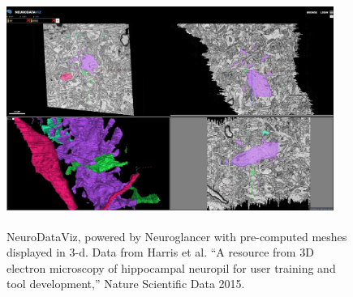 \documentclass[simplex.tex]{subfiles}
\begin{document}
\begin{figure}[!h]
\begin{cframed}
\centering
\includegraphics[width=0.95\textwidth, height = 3in]{../../figs/ndviz3d_fig.jpg}
\caption{NeuroDataViz, powered by Neuroglancer with pre-computed meshes
  displayed in 3-d. Data from Harris et al. ``A resource from 3D
  electron microscopy of hippocampal neuropil for user training and tool
  development,'' Nature Scientific Data 2015.}
\label{fig:name}
\end{cframed}
\end{figure}

\clearpage
\end{document}
